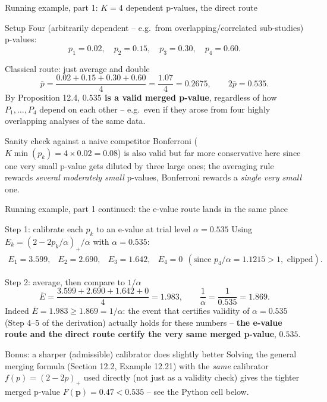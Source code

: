 \documentclass[aspectratio=169,10pt]{beamer}
\newcommand{\bp}{\mathbf{p}}
\begin{document}
\begin{frame}{Running example, part 1: $K=4$ dependent p-values, the direct route}
  \begin{block}{Setup}
    Four (arbitrarily dependent -- e.g.\ from overlapping/correlated sub-studies) p-values:
    \[
      p_1=0.02,\quad p_2=0.15,\quad p_3=0.30,\quad p_4=0.60.
    \]
  \end{block}
  \begin{block}{Classical route: just average and double}
    \[
      \bar p = \frac{0.02+0.15+0.30+0.60}{4} = \frac{1.07}{4} = 0.2675, \qquad 2\bar p = 0.535.
    \]
    By Proposition 12.4, \textbf{$0.535$ is a valid merged p-value}, regardless of how $P_1,\dots,P_4$ depend on each other -- e.g.\ even if they arose from four highly overlapping analyses of the same data.
  \end{block}
  \begin{block}{Sanity check against a naive competitor}
    Bonferroni ($K\min(p_k)=4\times0.02=0.08$) is also valid but far more conservative here since one very small p-value gets diluted by three large ones; the averaging rule rewards \emph{several moderately small} p-values, Bonferroni rewards a \emph{single very small} one.
  \end{block}
\end{frame}

\begin{frame}[allowframebreaks]{Running example, part 1 continued: the e-value route lands in the same place}
  \begin{block}{Step 1: calibrate each $p_k$ to an e-value at trial level $\alpha=0.535$}
    Using $E_k=(2-2p_k/\alpha)_+/\alpha$ with $\alpha=0.535$:
    \[
      \begin{array}{llll}
        E_1 = 3.599, & E_2 = 2.690, & E_3 = 1.642, & E_4 = 0 \ \ (\text{since } p_4/\alpha=1.1215>1,\text{ clipped}).
      \end{array}
    \]
  \end{block}
  \begin{block}{Step 2: average, then compare to $1/\alpha$}
    \[
      \bar E = \frac{3.599+2.690+1.642+0}{4} = 1.983, \qquad \frac1\alpha=\frac1{0.535}=1.869.
    \]
    Indeed $\bar E=1.983\ge1.869=1/\alpha$: the event that certifies validity of $\alpha=0.535$ (Step 4--5 of the derivation) actually holds for these numbers -- \textbf{the e-value route and the direct route certify the very same merged p-value}, $0.535$.
  \end{block}
  \begin{block}{Bonus: a sharper (admissible) calibrator does slightly better}
    Solving the general merging formula (Section 12.2, Example 12.21) with the \emph{same} calibrator $f(p)=(2-2p)_+$ used directly (not just as a validity check) gives the tighter merged p-value $F(\bp)=0.47 < 0.535$ -- see the Python cell below.
  \end{block}
\end{frame}
\end{document}
